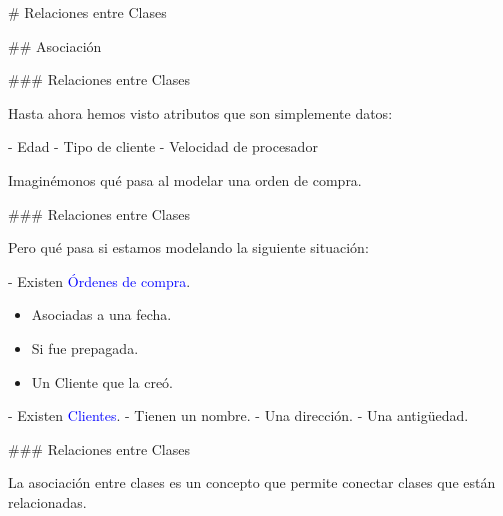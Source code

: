 # Relaciones entre Clases

## Asociación

### Relaciones entre Clases


Hasta ahora hemos visto atributos que son simplemente datos:

- Edad
- Tipo de cliente
- Velocidad de procesador

Imaginémonos qué pasa al modelar una orden de compra.

### Relaciones entre Clases


Pero qué pasa si estamos modelando la siguiente situación:

- Existen \textcolor{blue}{Órdenes de compra}.

    \begin{itemize}
        \item Asociadas a una fecha.
        \item Si fue prepagada.
        \item Un Cliente que la creó. 
    \end{itemize}

- Existen \textcolor{blue}{Clientes}.
    - Tienen un nombre.
    - Una dirección.
    - Una antigüedad.

\pause


\pause


### Relaciones entre Clases


La asociación entre clases es un concepto que permite conectar clases que están relacionadas.\newline

